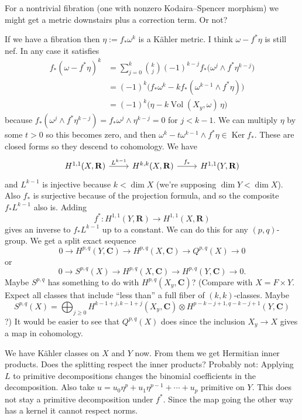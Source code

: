\documentclass[11pt]{amsart}
\theoremstyle{definition}
\def\lra{\longrightarrow}
\def\RR{\mathbf{R}}
\def\CC{\mathbf{C}}
\DeclareMathOperator{\Vol}{Vol}
\DeclareMathOperator{\Ker}{Ker}
\begin{document}
For a nontrivial fibration (one with nonzero Kodaira--Spencer morphism) we might get a metric downstairs plus a correction term.
Or not?

If we have a fibration then $\eta := f_*\omega^k$ is a K\"ahler metric.
I think $\omega - f^*\eta$ is still nef.
In any case it satisfies
\begin{align*}
f_*(\omega - f^*\eta)^k
&= \sum_{j=0}^k \binom{k}{j} (-1)^{k-j} f_*\bigl ( \omega^j \wedge f^*\eta^{k-j} \bigr)
\\
&= (-1)^k\bigl( f_*\omega^{k} - k f_*(\omega^{k-1} \wedge f^*\eta) \bigr)
\\
&= (-1)^k\bigl( \eta - k \Vol(X_y, \omega) \, \eta \bigr)
\end{align*}
because $f_*(\omega^{j} \wedge f^*\eta^{k-j}) = f_*\omega^j \wedge \eta^{k-j} = 0$ for $j < k-1$.
We can multiply $\eta$ by some $t > 0$ so this becomes zero, and then $\omega^k - t \omega^{k-1} \wedge f^*\eta \in \Ker f_*$.
These are closed forms so they descend to cohomology.
We have
\[
\begin{tikzcd}
H^{1,1}(X,\RR) \ar[r,"L^{k-1}"] & 
H^{k,k}(X,\RR) \ar[r,"f_*"] &
H^{1,1}(Y,\RR)
\end{tikzcd}
\]
and $L^{k-1}$ is injective because $k < \dim X$ (we're supposing $\dim Y < \dim X$).
Also $f_*$ is surjective because of the projection formula, and so the composite $f_* L^{k-1}$ also is.
Adding 
\[
f^* : H^{1,1}(Y,\RR) \to H^{1,1}(X,\RR)
\]
gives an inverse to $f_* L^{k-1}$ up to a constant.
We can do this for any $(p,q)$-group.
We get a split exact sequence
\[
0 \lra
H^{p,q}(Y,\CC) \lra
H^{p,q}(X,\CC) \lra
Q^{p,q}(X) \lra 
0
\]
or
\[
0 \lra
S^{p,q}(X) \lra 
H^{p,q}(X,\CC) \lra
H^{p,q}(Y,\CC) \lra
0.
\]
Maybe $S^{p,q}$ has something to do with $H^{p,q}(X_y, \CC)$?
(Compare with $X = F \times Y$.
Expect all classes that include ``less than'' a full fiber of $(k,k)$-classes.
Maybe 
\[
S^{p,q}(X)
= \bigoplus_{j \geq 0} H^{k-1+j,k-1+j}(X_y,\CC) \otimes H^{p-k-j+1,q-k-j+1}(Y,\CC)
\]
?)
It would be easier to see that $Q^{p,q}(X)$ does since the inclusion $X_y \to X$ gives a map in cohomology.

We have K\"ahler classes on $X$ and $Y$ now.
From them we get Hermitian inner products.
Does the splitting respect the inner products?
Probably not: Applying $L$ to primitive decompositions changes the binomial coefficients in the decomposition.
Also take $u = u_0 \eta^p + u_1 \eta^{p-1} + \cdots + u_p$ primitive on $Y$.
This does not stay a primitive decomposition under $f^*$.
Since the map going the other way has a kernel it cannot respect norms.
\end{document}
